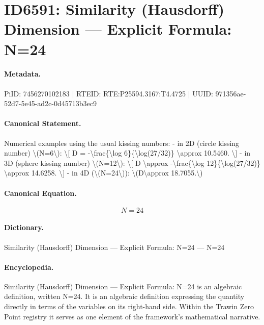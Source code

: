 \section*{ID6591: Similarity (Hausdorff) Dimension — Explicit Formula: N=24}
\paragraph{Metadata.}
PiID: 7456270102183 | RTEID: RTE:P25594.3167:T4.4725 | UUID: 971356ae-52d7-5e45-ad2c-0d45713b3ec9

\paragraph{Canonical Statement.}
Numerical examples using the usual kissing numbers: - in 2D (circle kissing number) \textbackslash{}(N=6\textbackslash{}): \textbackslash{}[ D = -\textbackslash{}frac\{\textbackslash{}log 6\}\{\textbackslash{}log(27/32)\} \textbackslash{}approx 10.5460. \textbackslash{}] - in 3D (sphere kissing number) \textbackslash{}(N=12\textbackslash{}): \textbackslash{}[ D \textbackslash{}approx -\textbackslash{}frac\{\textbackslash{}log 12\}\{\textbackslash{}log(27/32)\} \textbackslash{}approx 14.6258. \textbackslash{}] - in 4D (\textbackslash{}(N=24\textbackslash{})): \textbackslash{}(D\textbackslash{}approx 18.7055.\textbackslash{})

\paragraph{Canonical Equation.}
\[
N=24
\]

\paragraph{Dictionary.}
Similarity (Hausdorff) Dimension — Explicit Formula: N=24 — N=24

\paragraph{Encyclopedia.}
Similarity (Hausdorff) Dimension — Explicit Formula: N=24 is an algebraic definition, written N=24. It is an algebraic definition expressing the quantity directly in terms of the variables on its right-hand side. Within the Trawin Zero Point registry it serves as one element of the framework's mathematical narrative.
